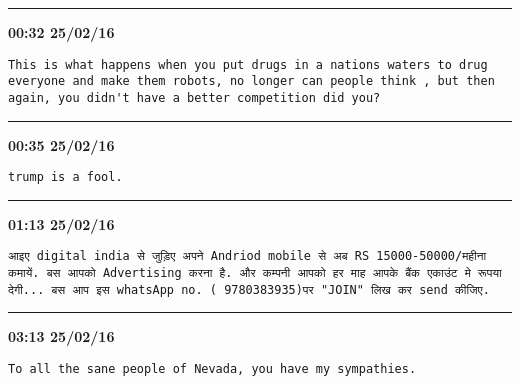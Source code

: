 \hrule%

\begin{adjustwidth}{0cm}{0cm}
\footnotesize \textbf{00:32 25/02/16}

\begin{lstlisting}[breaklines, breakatwhitespace, basicstyle=\small, frame=leftline]
This is what happens when you put drugs in a nations waters to drug everyone and make them robots, no longer can people think , but then again, you didn't have a better competition did you?
\end{lstlisting}
\end{adjustwidth}

\hrule%

\begin{adjustwidth}{0cm}{0cm}
\footnotesize \textbf{00:35 25/02/16}

\begin{lstlisting}[breaklines, breakatwhitespace, basicstyle=\small, frame=leftline]
trump is a fool.
\end{lstlisting}
\end{adjustwidth}

\hrule%

\begin{adjustwidth}{0cm}{0cm}
\footnotesize \textbf{01:13 25/02/16}

\begin{lstlisting}[breaklines, breakatwhitespace, basicstyle=\small, frame=leftline]
आइए digital india से जुड़िए अपने Andriod mobile से अब RS 15000-50000/महीना कमायें. बस आपको Advertising करना है. और कम्पनी आपको हर माह आपके बैंक एकाउंट मे रूपया देगी... बस आप इस whatsApp no. ( 9780383935)पर "JOIN" लिख कर send कीजिए.
\end{lstlisting}
\end{adjustwidth}

\hrule%

\begin{adjustwidth}{0cm}{0cm}
\footnotesize \textbf{03:13 25/02/16}

\begin{lstlisting}[breaklines, breakatwhitespace, basicstyle=\small, frame=leftline]
To all the sane people of Nevada, you have my sympathies.
\end{lstlisting}
\end{adjustwidth}

